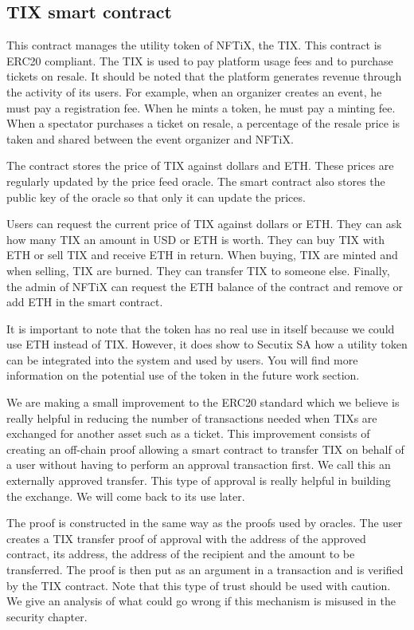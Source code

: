 \documentclass[a4paper,11pt,oneside]{report}
\begin{document}
\subsection{TIX smart contract}
This contract manages the utility token of NFTiX, the TIX. This contract is ERC20 compliant. The TIX is used to pay platform usage fees and to purchase tickets on resale. It should be noted that the platform generates revenue through the activity of its users. For example, when an organizer creates an event, he must pay a registration fee. When he mints a token, he must pay a minting fee. When a spectator purchases a ticket on resale, a percentage of the resale price is taken and shared between the event organizer and NFTiX.

The contract stores the price of TIX against dollars and ETH. These prices are regularly updated by the price feed oracle. The smart contract also stores the public key of the oracle so that only it can update the prices.

Users can request the current price of TIX against dollars or ETH. They can ask how many TIX an amount in USD or ETH is worth. They can buy TIX with ETH or sell TIX and receive ETH in return. When buying, TIX are minted and when selling, TIX are burned. They can transfer TIX to someone else. Finally, the admin of NFTiX can request the ETH balance of the contract and remove or add ETH in the smart contract.

It is important to note that the token has no real use in itself because we could use ETH instead of TIX. However, it does show to Secutix SA how a utility token can be integrated into the system and used by users. You will find more information on the potential use of the token in the future work section.

We are making a small improvement to the ERC20 standard which we believe is really helpful in reducing the number of transactions needed when TIXs are exchanged for another asset such as a ticket. This improvement consists of creating an off-chain proof allowing a smart contract to transfer TIX on behalf of a user without having to perform an approval transaction first. We call this an externally approved transfer. This type of approval is really helpful in building the exchange. We will come back to its use later.

The proof is constructed in the same way as the proofs used by oracles. The user creates a TIX transfer proof of approval with the address of the approved contract, its address, the address of the recipient and the amount to be transferred. The proof is then put as an argument in a transaction and is verified by the TIX contract. Note that this type of trust should be used with caution. We give an analysis of what could go wrong if this mechanism is misused in the security chapter.
\end{document}
